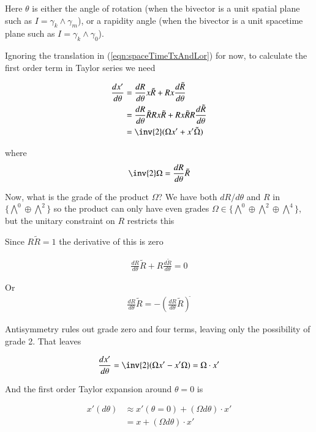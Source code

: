 \documentclass{article}
\begin{document}
Here $\theta$ is either the angle of rotation (when the bivector is a unit spatial plane such as $I = \gamma_k \wedge \gamma_m$), or a rapidity angle (when the bivector is a unit spacetime plane such as $I = \gamma_k \wedge \gamma_0$).

Ignoring the translation in (\ref{eqn:spaceTimeTxAndLor}) for now, to calculate the first order term in Taylor series we need

\begin{align*}
\frac{dx'}{d\theta} 
&= 
\frac{dR}{d\theta}  x \tilde{R} 
+
{R} x \frac{d\tilde{R}}{d\theta}  
\\
&= 
\frac{dR}{d\theta} \tilde{R} R x \tilde{R} 
+
{R} x \tilde{R} R \frac{d\tilde{R}}{d\theta}  
\\
&=
\inv{2} ( \Omega x' + x' \tilde{\Omega} ) \\
\end{align*}

where 
\begin{align*}
\inv{2}\Omega = \frac{dR}{d\theta} \tilde{R} 
\end{align*}

Now, what is the grade of the product $\Omega$?  We have both $dR/d\theta$ and $R$ in 
$\{\bigwedge^0 \oplus \bigwedge^2\}$
so the product can only have even grades $\Omega \in \{\bigwedge^0 \oplus \bigwedge^2 \oplus \bigwedge^4\}$, but the 
unitary constraint on $R$ restricts this

Since $R \tilde{R} = 1$ the derivative of this is zero

\begin{align*}
\frac{dR}{d\theta} \tilde{R} + {R} \frac{d\tilde{R}}{d\theta}  = 0
\end{align*}

Or
\begin{align*}
\frac{dR}{d\theta} \tilde{R} = - \left( \frac{dR}{d\theta} \tilde{R} \right)^{\tilde{}}
\end{align*}

Antisymmetry rules out grade zero and four terms, leaving only the possibility of grade 2.  That leaves

\begin{align*}
\frac{dx'}{d\theta} = \inv{2}(\Omega x' - x' \Omega) = \Omega \cdot x'
\end{align*}

And the first order Taylor expansion around $\theta =0$ is

\begin{align*}
x'(d\theta) 
&\approx x'(\theta = 0) + ( \Omega d\theta ) \cdot x' \\
&= x + ( \Omega d\theta ) \cdot x'
\end{align*}
\end{document}
